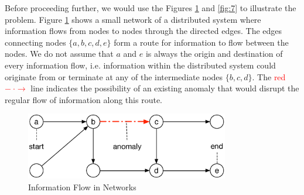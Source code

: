 \documentclass[conference]{IEEEtran.1.8}
\begin{document}
Before proceeding further, we would use the Figures \ref{fig:travel_graph} and \ref{fig:7} to illustrate the problem. Figure \ref{fig:travel_graph} shows a small network of a distributed system where information flows from nodes to nodes through the directed edges. The edges connecting nodes $\{a, b, c, d, e\}$ form a route for information to flow between the nodes. We do not assume that $a$ and $e$ is always the origin and destination of every information flow, i.e. information within the distributed system could originate from or terminate at any of the intermediate nodes $\{b, c, d\}$. The \textcolor{red}{red $- ~ \cdot \rightarrow$} line indicates the possibility of an existing anomaly that would disrupt the regular flow of information along this route.
\begin{figure}[htb]
	\centering
	\includegraphics[width=3.5in]{travel_graph}
	\caption{Information Flow in Networks}
	\label{fig:travel_graph}
\end{figure}
\end{document}
